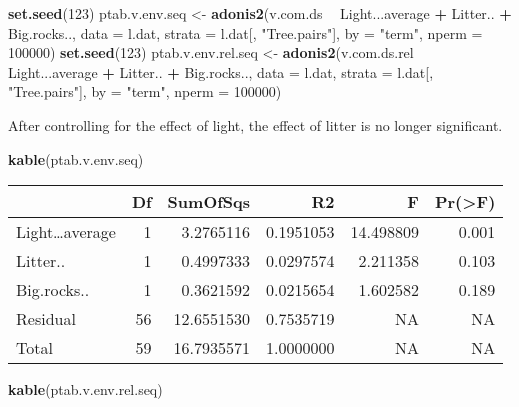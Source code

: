 \documentclass[]{article}
\newenvironment{Shaded}{\begin{snugshade}}{\end{snugshade}}
\newcommand{\KeywordTok}[1]{\textcolor[rgb]{0.13,0.29,0.53}{\textbf{#1}}}
\newcommand{\DataTypeTok}[1]{\textcolor[rgb]{0.13,0.29,0.53}{#1}}
\newcommand{\DecValTok}[1]{\textcolor[rgb]{0.00,0.00,0.81}{#1}}
\newcommand{\StringTok}[1]{\textcolor[rgb]{0.31,0.60,0.02}{#1}}
\newcommand{\OperatorTok}[1]{\textcolor[rgb]{0.81,0.36,0.00}{\textbf{#1}}}
\newcommand{\NormalTok}[1]{#1}
\begin{document}
\begin{Shaded}
\begin{Highlighting}[]
\KeywordTok{set.seed}\NormalTok{(}\DecValTok{123}\NormalTok{)}
\NormalTok{ptab.v.env.seq <-}\StringTok{ }\KeywordTok{adonis2}\NormalTok{(v.com.ds }\OperatorTok{~}\StringTok{ }\NormalTok{Light...average }\OperatorTok{+}\StringTok{ }\NormalTok{Litter.. }\OperatorTok{+}\StringTok{ }\NormalTok{Big.rocks..,}
                      \DataTypeTok{data =}\NormalTok{ l.dat, }
                      \DataTypeTok{strata =}\NormalTok{ l.dat[, }\StringTok{"Tree.pairs"}\NormalTok{], }
                      \DataTypeTok{by =} \StringTok{"term"}\NormalTok{, }\DataTypeTok{nperm =} \DecValTok{100000}\NormalTok{)}
\KeywordTok{set.seed}\NormalTok{(}\DecValTok{123}\NormalTok{)}
\NormalTok{ptab.v.env.rel.seq <-}\StringTok{ }\KeywordTok{adonis2}\NormalTok{(v.com.ds.rel }\OperatorTok{~}\StringTok{ }\NormalTok{Light...average }\OperatorTok{+}\StringTok{ }\NormalTok{Litter.. }\OperatorTok{+}\StringTok{ }\NormalTok{Big.rocks..,}
                          \DataTypeTok{data =}\NormalTok{ l.dat, }
                          \DataTypeTok{strata =}\NormalTok{ l.dat[, }\StringTok{"Tree.pairs"}\NormalTok{], }
                          \DataTypeTok{by =} \StringTok{"term"}\NormalTok{, }\DataTypeTok{nperm =} \DecValTok{100000}\NormalTok{)}
\end{Highlighting}
\end{Shaded}

After controlling for the effect of light, the effect of litter is no
longer significant.

\begin{Shaded}
\begin{Highlighting}[]
\KeywordTok{kable}\NormalTok{(ptab.v.env.seq)}
\end{Highlighting}
\end{Shaded}

\begin{longtable}[]{@{}lrrrrr@{}}
\toprule
& Df & SumOfSqs & R2 & F & Pr(\textgreater{}F)\tabularnewline
\midrule
\endhead
Light\ldots{}average & 1 & 3.2765116 & 0.1951053 & 14.498809 &
0.001\tabularnewline
Litter.. & 1 & 0.4997333 & 0.0297574 & 2.211358 & 0.103\tabularnewline
Big.rocks.. & 1 & 0.3621592 & 0.0215654 & 1.602582 &
0.189\tabularnewline
Residual & 56 & 12.6551530 & 0.7535719 & NA & NA\tabularnewline
Total & 59 & 16.7935571 & 1.0000000 & NA & NA\tabularnewline
\bottomrule
\end{longtable}

\begin{Shaded}
\begin{Highlighting}[]
\KeywordTok{kable}\NormalTok{(ptab.v.env.rel.seq)}
\end{Highlighting}
\end{Shaded}
\end{document}
